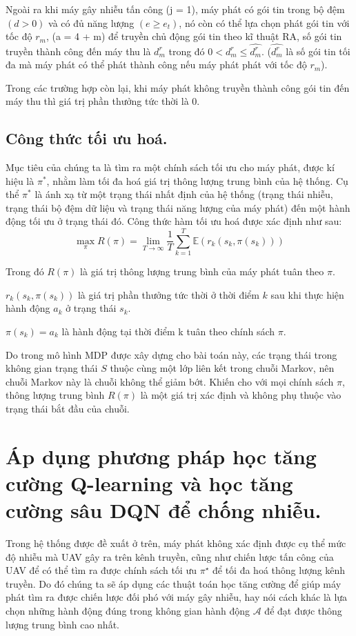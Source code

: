 \documentclass{uetgraduation}
\begin{document}
Ngoài ra khi máy gây nhiễu tấn công (j = 1), máy phát có gói tin trong bộ đệm $(d > 0)$ và có đủ năng lượng $(e \geq e_t)$, nó còn có thể lựa chọn phát gói 
tin với tốc độ $r_m$, (a = 4 + m) để truyền chủ động gói tin theo kĩ thuật RA, số gói tin truyền thành công đến máy thu là $d_m^r$ trong đó $0 < d_m^r \leq \hat{d_m^r}$.
($\hat{d_m^r}$ là số gói tin tối đa mà máy phát có thể phát thành công nếu máy phát phát với tốc độ $r_m$).

Trong các trường hợp còn lại, khi máy phát không truyền thành công gói tin đến máy thu thì giá trị phần thưởng tức thời là 0.


\subsection{Công thức tối ưu hoá.}
Mục tiêu của chúng ta là tìm ra một chính sách tối ưu cho máy phát, được kí hiệu là $\pi^*$, nhằm làm tối đa hoá giá trị thông lượng trung bình
của hệ thống. Cụ thể $\pi^*$ là ánh xạ từ một trạng thái nhất định của hệ thống (trạng thái nhiễu, trạng thái bộ đệm dữ liệu và trạng thái năng
lượng của máy phát) đến một hành động tối ưu ở trạng thái đó.
Công thức hàm tối ưu hoá được xác định như sau:
\[
\max_{\pi} R(\pi) = \lim_{T \to \infty} \frac{1}{T} \sum_{k=1}^{T} \mathbb{E}\left( r_k(s_k, \pi(s_k)) \right)
\]

Trong đó $R(\pi)$ là giá trị thông lượng trung bình của máy phát tuân theo $\pi$.

$r_k(s_k, \pi(s_k))$ là giá trị phần thưởng tức thời ở thời điểm $k$ sau khi thực hiện hành động $a_k$ ở trạng thái $s_k$. 

$\pi(s_k) = a_k$ là hành động tại thời điểm k tuân theo chính sách $\pi$.

Do trong mô hình MDP được xây dựng cho bài toán này, các trạng thái trong không gian trạng thái $S$ thuộc cùng một lớp liên kết trong chuỗi Markov, nên chuỗi Markov này là chuỗi không thể giảm bớt.
Khiến cho với mọi chính sách $\pi$, thông lượng trung bình $R(\pi)$ là một giá trị xác định và không phụ thuộc vào trạng thái bắt đầu của chuỗi.

\section{Áp dụng phương pháp học tăng cường Q-learning và học tăng cường sâu DQN để chống nhiễu.}
Trong hệ thống được đề xuất ở trên, máy phát không xác định được cụ thể mức độ nhiễu mà UAV gây ra trên kênh truyền, cũng như chiến lược tấn công của UAV để có thể tìm ra được
chính sách tối ưu $\pi^\star$ để tối đa hoá thông lượng kênh truyền. Do đó chúng ta sẽ áp dụng các thuật toán học tăng cường để giúp máy phát tìm ra được chiến lược đối
phó với máy gây nhiễu, hay nói cách khác là lựa chọn những hành động đúng trong không gian hành động $\mathcal{A}$ để đạt được thông lượng trung bình cao nhất.
\end{document}
